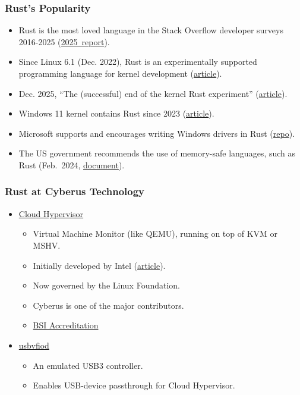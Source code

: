\begin{frame}[fragile]
    \frametitle{Rust's Popularity}
  \begin{itemize}
    \item Rust is the most loved language in the Stack Overflow developer surveys 2016-2025 (\href{https://survey.stackoverflow.co/2025/technology\#admired-and-desired}{2025~report}).
    \pause
    \item Since Linux 6.1 (Dec. 2022), Rust is an experimentally supported programming language for kernel development (\href{https://lwn.net/Articles/910762/}{article}).
    \item Dec. 2025, ``The (successful) end of the kernel Rust experiment'' (\href{https://lwn.net/Articles/1049831/}{article}).
    \pause
    \item Windows 11 kernel contains Rust since 2023 (\href{https://rustify.rs/articles/rust-in-windows-kernel-microsoft-2026}{article}).
    \item Microsoft supports and encourages writing Windows drivers in Rust (\href{https://github.com/microsoft/windows-drivers-rs}{repo}).
    \pause
    \item The US government recommends the use of memory-safe languages, such as Rust (Feb.~2024, \href{https://bidenwhitehouse.archives.gov/wp-content/uploads/2024/02/Final-ONCD-Technical-Report.pdf}{document}).
  \end{itemize}
\end{frame}

\begin{frame}[fragile]
    \frametitle{Rust at Cyberus Technology}
    \begin{itemize}
        \item \href{https://github.com/cloud-hypervisor/cloud-hypervisor}{Cloud Hypervisor}
        \begin{itemize}
            \item Virtual Machine Monitor (like QEMU), running on top of KVM or MSHV.
            \item Initially developed by Intel (\href{https://thenewstack.io/intel-releases-cloud-hypervisor-based-on-same-components-as-amazons-firecracker/}{article}).
            \item Now governed by the Linux Foundation.
            \item Cyberus is one of the major contributors.
            \item \href{https://www.bsi.bund.de/SharedDocs/Zulassung/DE/Produkte/Cyberus_Hypervisor_BSI-VSA-10950.html}{BSI Accreditation}
        \end{itemize}
            \pause
            \vspace{.3cm}
        \item \href{https://github.com/cyberus-technology/usbvfiod}{usbvfiod}
        \begin{itemize}
            \item An emulated USB3 controller.
            \item Enables USB-device passthrough for Cloud Hypervisor.
        \end{itemize}
    \end{itemize}
\end{frame}

